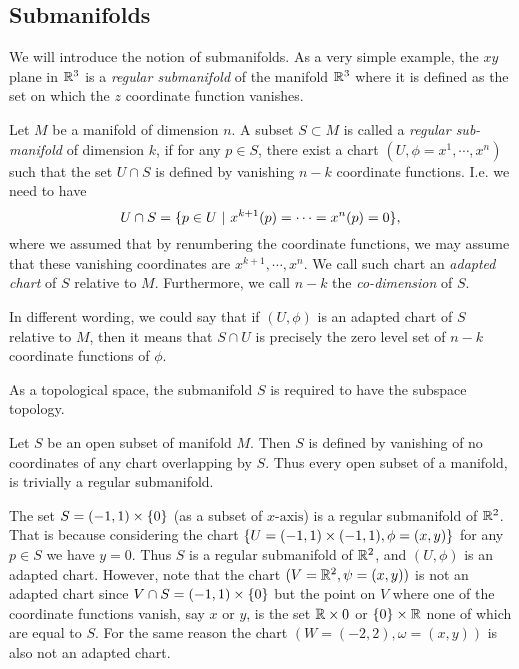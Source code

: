 \subsection{Submanifolds}
We will introduce the notion of submanifolds. As a very simple example, the $ xy $ plane in $ \mathbb{R}^3 $ is a \emph{regular submanifold} of the manifold $ \mathbb{R}^3 $ where it is defined as the set on which the $ z $ coordinate function vanishes. 

\begin{definition}
	Let $ M $ be a manifold of dimension $ n $. A subset $ S \subset M $ is called a \emph{regular sub-manifold} of dimension $ k $, if for any $ p \in S $, there exist a chart $ (U,\phi = x^1,\cdots,x^n) $ such that the set $ U\cap S $ is defined by vanishing $ n-k $ coordinate functions. I.e. we need to have
	\[ U \cap S = \set{p \in U\ |\ x^{k+1}(p)=\cdots=x^n(p) = 0}, \]
	 where we assumed that by renumbering the coordinate functions, we may assume that these vanishing coordinates are $ x^{k+1},\cdots,x^n $. We call such chart an \emph{adapted chart} of $ S $ relative to $ M $. Furthermore, we call $ n-k $ the \emph{co-dimension} of $ S $.
\end{definition}
\begin{remark}
	In different wording, we could say that if $ (U,\phi) $ is an adapted chart of $ S  $ relative to $ M $, then it means that $ S\cap U $ is precisely the zero level set of $ n-k $ coordinate functions of $ \phi $. 
\end{remark}
\begin{remark}
	As a topological space, the submanifold $ S $ is required to have the subspace topology.
\end{remark}

\begin{example}
	Let $ S $ be an open subset of manifold $ M $. Then $ S $ is defined by vanishing of no coordinates of any chart overlapping by $ S $. Thus every open subset of a manifold, is trivially a regular submanifold.
\end{example}

\begin{example}[A submanifold of $ \R^2 $]
	The set $ S = (-1,1) \times \{0\} $ (as a subset of $ x\text{-axis} $) is a regular submanifold of $ \R^2 $. That is because considering the chart $ \{U=(-1,1)\times(-1,1),\phi= (x,y)\} $ for any $ p \in S $ we have $ y = 0 $. Thus $ S $ is a regular submanifold of $ \R^2 $, and $ (U,\phi) $ is an adapted chart. However, note that the chart $ (V = \mathbb{R}^2, \psi=(x,y)) $ is not an adapted chart since $ V \cap S = (-1,1)\times \{0\} $ but the point on $ V $ where one of the coordinate functions vanish, say $ x $ or $ y $, is the set $ \mathbb{R}\times{0} $ or $ \{0\}\times \mathbb{R} $ none of which are equal to $ S $. For the same reason the chart $ (W = (-2,2), \omega=(x,y)) $ is also not an adapted chart.
\end{example}


